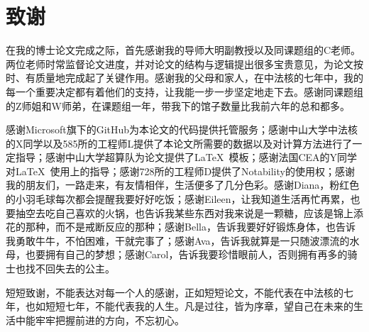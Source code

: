 
\chapter{致谢}

在我的博士论文完成之际，首先感谢我的导师大明副教授以及同课题组的C老师。两位老师时常监督论文进度，并对论文的结构与逻辑提出很多宝贵意见，为论文按时、有质量地完成起了关键作用。感谢我的父母和家人，在中法核的七年中，我的每一个重要决定都有着他们的支持，让我能一步一步坚定地走下去。感谢同课题组的Z师姐和W师弟，在课题组一年，带我下的馆子数量比我前六年的总和都多。

感谢Microsoft旗下的GitHub为本论文的代码提供托管服务；感谢中山大学中法核的X同学以及585所的工程师L提供了本论文所需要的数据以及对计算方法进行了一定指导；感谢中山大学超算队为论文提供了\LaTeX\ 模板；感谢法国CEA的Y同学对\LaTeX\ 使用上的指导；感谢728所的工程师D提供了Notability的使用权；感谢我的朋友们，一路走来，有友情相伴，生活便多了几分色彩。感谢Diana，粉红色的小羽毛球每次都会提醒我要好好吃饭；感谢Eileen，让我知道生活再忙再累，也要抽空去吃自己喜欢的火锅，也告诉我某些东西对我来说是一颗糖，应该是锦上添花的那种，而不是戒断反应的那种；感谢Bella，告诉我要好好锻炼身体，也告诉我勇敢牛牛，不怕困难，干就完事了；感谢Ava，告诉我就算是一只随波漂流的水母，也要拥有自己的梦想；感谢Carol，告诉我要珍惜眼前人，否则拥有再多的骑士也找不回失去的公主。

短短致谢，不能表达对每一个人的感谢，正如短短论文，不能代表在中法核的七年，也如短短七年，不能代表我的人生。凡是过往，皆为序章，望自己在未来的生活中能牢牢把握前进的方向，不忘初心。


